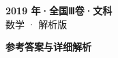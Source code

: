 \documentclass[zihao=-4, a4paper]{ctexart}
\begin{document}
\begin{center}
  {\Large\bfseries 2019 年·全国Ⅲ卷·文科}\\[4pt]
  {\large 数学 · 解析版}
\end{center}
\medskip
{}

\clearpage
{}
\begin{center}{\Large\bfseries 参考答案与详细解析}\end{center}
\medskip

\end{document}
